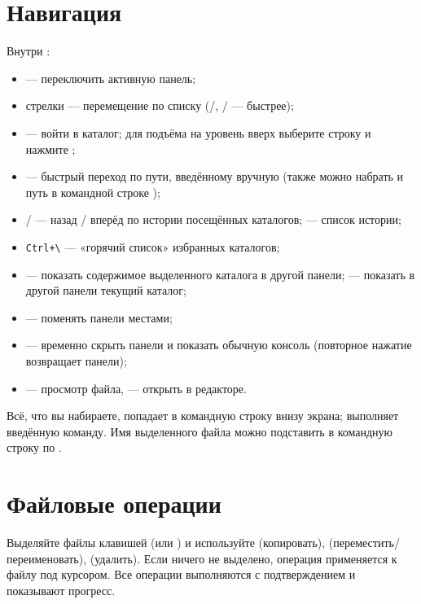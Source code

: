 \section{Навигация}

Внутри :
\begin{itemize}
  \item {} --- переключить активную панель;
  \item стрелки --- перемещение по списку
    (/, / --- быстрее);
  \item {} --- войти в каталог; для подъёма на уровень
    вверх выберите строку  и нажмите ;
  \item {} --- быстрый переход по пути, введённому
    вручную (также можно набрать  и путь в командной
    строке );
  \item {} /  --- назад / вперёд по истории
    посещённых каталогов;  --- список истории;
  \item \texttt{Ctrl+\textbackslash} --- «горячий список»
    избранных каталогов;
  \item {} --- показать содержимое выделенного каталога
    в другой панели;  --- показать в другой панели
    текущий каталог;
  \item {} --- поменять панели местами;
  \item {} --- временно скрыть панели и показать
    обычную консоль (повторное нажатие возвращает панели);
  \item {} --- просмотр файла,  --- открыть в
    редакторе.
\end{itemize}

Всё, что вы набираете, попадает в командную строку внизу
экрана;  выполняет введённую команду. Имя
выделенного файла можно подставить в командную строку
по .

\section{Файловые операции}

Выделяйте файлы клавишей  (или ) и
используйте  (копировать),  (переместить/
переименовать),  (удалить). Если ничего не выделено,
операция применяется к файлу под курсором. Все операции
выполняются с подтверждением и показывают прогресс.

